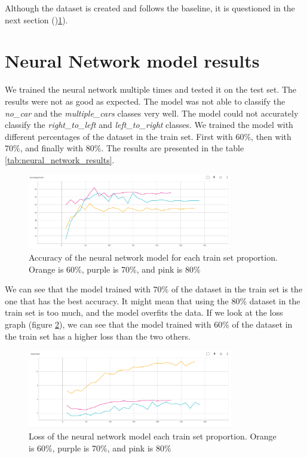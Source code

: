 Although the dataset is created and follows the baseline, it is questioned in the next section ()\ref{sec:neural_network_results}).

\section{Neural Network model results}
\label{sec:neural_network_results}

We trained the neural network multiple times and tested it on the test set. The results were not as good as expected. The model was not able to classify the \textit{no\_car} and the \textit{multiple\_cars} classes very well. The model could not accurately classify the \textit{right\_to\_left} and \textit{left\_to\_right} classes. We trained the model with different percentages of the dataset in the train set. First with 60\%, then with 70\%, and finally with 80\%.
The results are presented in the table \ref{tab:neural_network_results}.

\begin{figure}[H]
    \centering
    \includegraphics[width=0.8\textwidth]{images/accuracy_test.png}
    \caption{Accuracy of the neural network model for each train set proportion. Orange is 60\%, purple is 70\%, and pink is 80\%}
    \label{ftab:neural_network_results}
\end{figure}

We can see that the model trained with 70\% of the dataset in the train set is the one that has the best accuracy. It might mean that using the 80\% dataset in the train set is too much, and the model overfits the data. If we look at the loss graph (figure \ref{fig:loss_test}), we can see that the model trained with 60\% of the dataset in the train set has a higher loss than the two others. 

\begin{figure}[H]
    \centering
    \includegraphics[width=0.8\textwidth]{images/loss_test.png}
    \caption{Loss of the neural network model each train set proportion. Orange is 60\%, purple is 70\%, and pink is 80\%}
    \label{fig:loss_test}
\end{figure}

